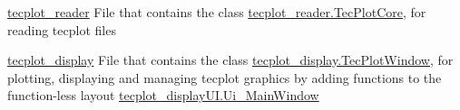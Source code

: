 \begin{DoxyItemize}
\item {\ttfamily \hyperlink{namespacetecplot__modules_1_1tecplot__reader}{tecplot\+\_\+reader}} File that contains the class \hyperlink{classtecplot__modules_1_1tecplot__reader_1_1_tec_plot_core}{tecplot\+\_\+reader.\+Tec\+Plot\+Core}, for reading tecplot files\end{DoxyItemize}
\begin{DoxyItemize}
\item {\ttfamily \hyperlink{namespacetecplot__modules_1_1tecplot__display}{tecplot\+\_\+display}} File that contains the class \hyperlink{classtecplot__modules_1_1tecplot__display_1_1_tec_plot_window}{tecplot\+\_\+display.\+Tec\+Plot\+Window}, for plotting, displaying and managing tecplot graphics by adding functions to the function-\/less layout \hyperlink{classtecplot__modules_1_1tecplot__display_u_i_1_1_ui___main_window}{tecplot\+\_\+display\+U\+I.\+Ui\+\_\+\+Main\+Window} \end{DoxyItemize}
